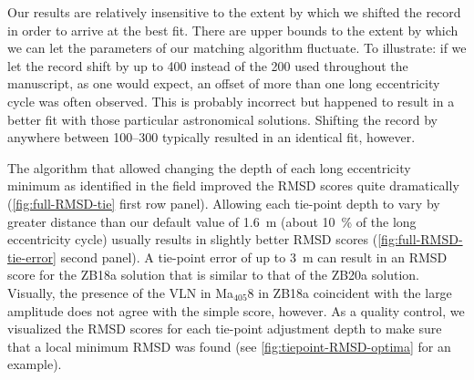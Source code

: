 \documentclass[]{agujournal2019}
\newcommand{\ma}[1]{Ma\(_{405}\)#1} %
\newcommand{\rez}{\textcolor{magenta}}
\newcommand{\ijk}{\textcolor{blue}}
\begin{document}
Our results are relatively insensitive to the extent by which we shifted the record in order to arrive at the best fit.
There are upper bounds to the extent by which we can let the parameters of our matching algorithm fluctuate.
To illustrate: if we let the record shift by up to \qty{400}{\kiloyear} instead of the \qty{200}{\kiloyear} used throughout the manuscript, as one would expect, an offset of more than one long eccentricity cycle was often observed.
This is probably incorrect but happened to result in a better fit with those particular astronomical solutions.
Shifting the record by anywhere between \qtyrange{100}{300}{\kiloyear} typically resulted in an identical fit, however.

The algorithm that allowed changing the depth of each long eccentricity minimum as identified in the field improved the \gls{RMSD} scores quite dramatically (\cref{fig:full-RMSD-tie} first row panel).
Allowing each tie-point depth to vary by greater distance than our default value of \qty{1.6}{\metre} (about \qty{10}{\percent} of the long eccentricity cycle) usually results in slightly better \gls{RMSD} scores (\cref{fig:full-RMSD-tie-error} second panel).
A tie-point error of up to \qty{3}{\metre} can result in an \gls{RMSD} score for the ZB18a solution that is similar to that of the ZB20a solution.
Visually, the presence of the \gls{VLN} in \ma{8} in ZB18a coincident with the large amplitude does not agree with the simple score, however.
As a quality control, we visualized the \gls{RMSD} scores for each  tie-point  adjustment  depth\add{,} to make sure that a local minimum  \gls{RMSD}  was found (see \cref{fig:tiepoint-RMSD-optima} for an example).
\end{document}
